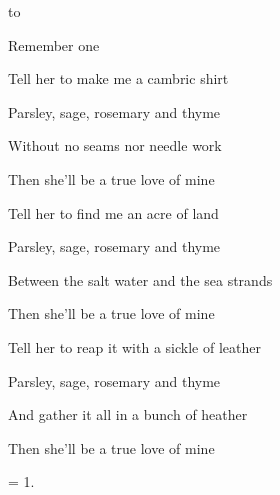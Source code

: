 

\zs
{} to  

  

Remember  one   

      
\ks

\zs
Tell her to make me a cambric shirt

Parsley, sage, rosemary and thyme

Without no seams nor needle work

Then she'll be a true love of mine
\ks

\zs
Tell her to find me an acre of land

Parsley, sage, rosemary and thyme

Between the salt water and the sea strands

Then she'll be a true love of mine
\ks

\zs
Tell her to reap it with a sickle of leather

Parsley, sage, rosemary and thyme

And gather it all in a bunch of heather

Then she'll be a true love of mine
\ks

\zs
= 1.
\ks

\kp
